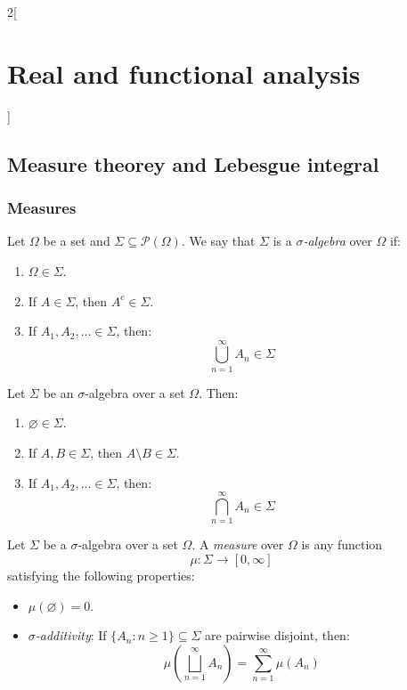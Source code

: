 \documentclass[../../../main_math.tex]{subfiles}
\begin{document}
\renewcommand{\col}{\ana}
\begin{multicols}{2}[\section{Real and functional analysis}]
  \subsection{Measure theorey and Lebesgue integral}
  \subsubsection{Measures}
  \begin{definition}
    Let $\Omega$ be a  set and $\Sigma\subseteq\mathcal{P}(\Omega)$. We say that $\Sigma$ is a \emph{$\sigma$-algebra} over $\Omega$ if:
    \begin{enumerate}
      \item $\Omega\in\Sigma$.
      \item If $A\in\Sigma$, then $A^c\in\Sigma$.
      \item If $A_1,A_2,\ldots\in\Sigma$, then: $$\bigcup_{n=1}^\infty A_n\in\Sigma$$
    \end{enumerate}
  \end{definition}
  \begin{proposition}
    Let $\Sigma$ be an $\sigma$-algebra over a set $\Omega$. Then:
    \begin{enumerate}
      \item $\varnothing\in\Sigma$.
      \item If $A,B\in\Sigma$, then $A\setminus B\in\Sigma$.
      \item If $A_1,A_2,\ldots\in\Sigma$, then: $$\bigcap_{n=1}^\infty A_n\in\Sigma$$
    \end{enumerate}
  \end{proposition}
  \begin{definition}[Measure]
    Let $\Sigma$ be a $\sigma$-algebra over a set $\Omega$. A \emph{measure} over $\Omega$ is any function $$\mu:\Sigma\longrightarrow[0,\infty]$$ satisfying the following properties:
    \begin{itemize}
      \item $\mu(\varnothing)=0$.
      \item \emph{$\sigma$-additivity}: If $\{A_n:n\geq1\}\subseteq\Sigma$ are pairwise disjoint, then: $$\mu\left(\bigsqcup_{n=1}^\infty A_n\right)=\sum_{n=1}^\infty \mu(A_n)$$
    \end{itemize}

\end{definition}
\end{multicols}
\end{document}
